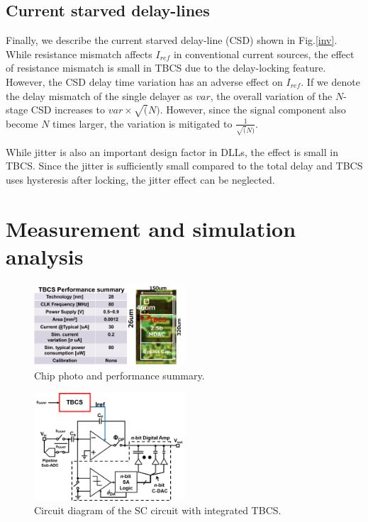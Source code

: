\documentclass[paper]{ieice}
\begin{document}
\subsection{Current starved delay-lines}

Finally, we describe the current starved delay-line (CSD) shown in Fig.\ref{inv}. While resistance mismatch affects $I_{ref}$ in conventional current sources, the effect of resistance mismatch is small in TBCS due to the delay-locking feature. However, the CSD delay time variation has an adverse effect on $I_{ref}$.
If we denote the delay mismatch of the single delayer as $var$, the overall variation of the $N$-stage CSD increases to $var \times \sqrt(N)$. However, since the signal component also become  $N$ times larger, the variation is mitigated to $\frac{1}{\sqrt(N)}$.

While jitter is also an important design factor in DLLs, the effect is small in TBCS. Since the jitter is sufficiently small compared to the total delay and TBCS uses hysteresis after locking, the jitter effect can be neglected.

\section{Measurement and simulation analysis}
\begin{figure}[!]
\centering
 \includegraphics[width=0.5\textwidth]{figs/chip.png}
  \caption{Chip photo and performance summary.}
\label{chip}
\end{figure}

\begin{figure}[!]
\centering
 \includegraphics[width=0.5\textwidth]{figs/switchcap.png}
  \caption{Circuit diagram of the SC circuit with integrated TBCS.}
\label{scap}
\end{figure}
\end{document}
